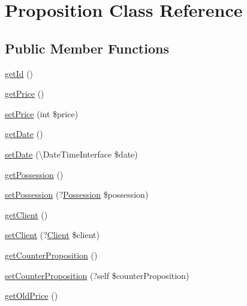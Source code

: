\hypertarget{class_app_1_1_entity_1_1_proposition}{}\section{Proposition Class Reference}
\label{class_app_1_1_entity_1_1_proposition}
\subsection*{Public Member Functions}
\begin{DoxyCompactItemize}
\item 
\mbox{\hyperlink{class_app_1_1_entity_1_1_proposition_a12251d0c022e9e21c137a105ff683f13}{get\+Id}} ()
\item 
\mbox{\hyperlink{class_app_1_1_entity_1_1_proposition_a38146d2beb1dd6dfd0f2a5886e18a538}{get\+Price}} ()
\item 
\mbox{\hyperlink{class_app_1_1_entity_1_1_proposition_a79205594e0a2db85726182f29e659020}{set\+Price}} (int \$price)
\item 
\mbox{\hyperlink{class_app_1_1_entity_1_1_proposition_a24d89b0ad05ea2e33626b1fc8ed59bc3}{get\+Date}} ()
\item 
\mbox{\hyperlink{class_app_1_1_entity_1_1_proposition_a7bd268eb6b87dd3cd469dee46bba778a}{set\+Date}} (\textbackslash{}Date\+Time\+Interface \$date)
\item 
\mbox{\hyperlink{class_app_1_1_entity_1_1_proposition_a4ad5c74255a75f0d61664cba32657af7}{get\+Possession}} ()
\item 
\mbox{\hyperlink{class_app_1_1_entity_1_1_proposition_ad625cd7a23ddbd219c5f6b58e85f2977}{set\+Possession}} (?\mbox{\hyperlink{class_app_1_1_entity_1_1_possession}{Possession}} \$possession)
\item 
\mbox{\hyperlink{class_app_1_1_entity_1_1_proposition_a2f5f44fdf5404c87cc3a7b5719d85306}{get\+Client}} ()
\item 
\mbox{\hyperlink{class_app_1_1_entity_1_1_proposition_a8122a5458a0e4aa14a4a16840c769a64}{set\+Client}} (?\mbox{\hyperlink{class_app_1_1_entity_1_1_client}{Client}} \$client)
\item 
\mbox{\hyperlink{class_app_1_1_entity_1_1_proposition_ac2a3d42d799371279b3f795bf4c6ae3a}{get\+Counter\+Proposition}} ()
\item 
\mbox{\hyperlink{class_app_1_1_entity_1_1_proposition_a3f68ab62013f2aa1f33b1545136bce7e}{set\+Counter\+Proposition}} (?self \$counter\+Proposition)
\item 
\mbox{\hyperlink{class_app_1_1_entity_1_1_proposition_a2fe34e9231846bb458e5bcd806f85d71}{get\+Old\+Price}} ()

\end{DoxyCompactItemize}
